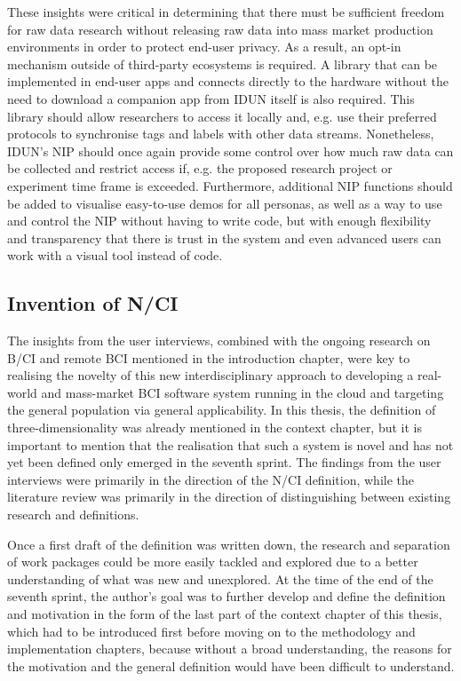 These insights were critical in determining that there must be sufficient freedom for raw data research without releasing raw data into mass market production environments in order to protect end-user privacy. As a result, an opt-in mechanism outside of third-party ecosystems is required. A library that can be implemented in end-user apps and connects directly to the hardware without the need to download a companion app from IDUN itself is also required. This library should allow researchers to access it locally and, e.g. use their preferred protocols to synchronise tags and labels with other data streams. Nonetheless, IDUN's NIP should once again provide some control over how much raw data can be collected and restrict access if, e.g. the proposed research project or experiment time frame is exceeded. Furthermore, additional NIP functions should be added to visualise easy-to-use demos for all personas, as well as a way to use and control the NIP without having to write code, but with enough flexibility and transparency that there is trust in the system and even advanced users can work with a visual tool instead of code.

\subsection{Invention of N/CI}
\label{chapter4-invention-of-nci}

The insights from the user interviews, combined with the ongoing research on B/CI and remote BCI mentioned in the introduction chapter, were key to realising the novelty of this new interdisciplinary approach to developing a real-world and mass-market BCI software system running in the cloud and targeting the general population via general applicability. In this thesis, the definition of three-dimensionality was already mentioned in the context chapter, but it is important to mention that the realisation that such a system is novel and has not yet been defined only emerged in the seventh sprint. The findings from the user interviews were primarily in the direction of the N/CI definition, while the literature review was primarily in the direction of distinguishing between existing research and definitions.

Once a first draft of the definition was written down, the research and separation of work packages could be more easily tackled and explored due to a better understanding of what was new and unexplored. At the time of the end of the seventh sprint, the author's goal was to further develop and define the definition and motivation in the form of the last part of the context chapter of this thesis, which had to be introduced first before moving on to the methodology and implementation chapters, because without a broad understanding, the reasons for the motivation and the general definition would have been difficult to understand.

